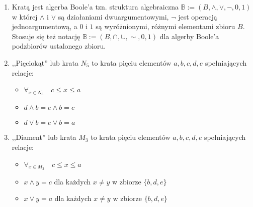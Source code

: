 \begin{przyk}
\begin{enumerate}[\rm(1)]
\item
Kratą jest algerba Boole'a tzn. struktura algebraiczna $\mathbb{B}:=(B,\wedge,\vee,\neg,0,1)$ w której $\wedge$ i $\vee$ są działaniami dwuargumentowymi, $\neg$ jest operacją jednoargumentową, a $0$ i $1$ są wyróżnionymi, różnymi elementami zbioru $B$. Stosuje się też notację $\mathbb{B}:=(B,\cap,\cup,\sim,0,1)$ dla algerby Boole'a podzbiorów ustalonego zbioru.
\item
,,Pięciokąt'' lub krata $N_5$ to krata pięciu elementów $a,b,c,d,e$ spełniających relacje:
\begin{itemize}
\item $\forall_{x\in N_5}\quad c\leq x\leq a$
\item $d\wedge b=e\wedge b=c$
\item $d\vee b=e\vee b=a$
\end{itemize}
\item
,,Diament'' lub krata $M_3$ to krata pięciu elementów $a,b,c,d,e$ spełniających relacje:
\begin{itemize}
\item $\forall_{x\in M_3}\quad c\leq x\leq a$
\item $x\wedge y=c$ dla każdych $x\neq y$ w zbiorze $\{b,d,e\}$
\item $x\vee y=a$ dla każdych $x\neq y$ w zbiorze $\{b,d,e\}$
\end{itemize}
\end{enumerate}
\end{przyk}

\clearpage
